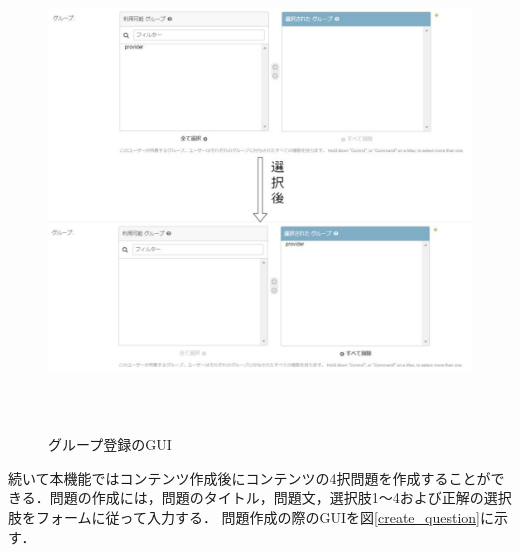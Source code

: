 \begin{figure}[htbp]
    \begin{center}
        \includegraphics[width=13cm,height=12cm,keepaspectratio]{group_register-crop.pdf}\\
    \end{center}
    \caption{グループ登録のGUI}
    \label{group_register}
\end{figure}

\newpage
続いて本機能ではコンテンツ作成後にコンテンツの4択問題を作成することができる．問題の作成には，問題のタイトル，問題文，選択肢1～4および正解の選択肢をフォームに従って入力する．
問題作成の際のGUIを図\ref{create_question}に示す．

